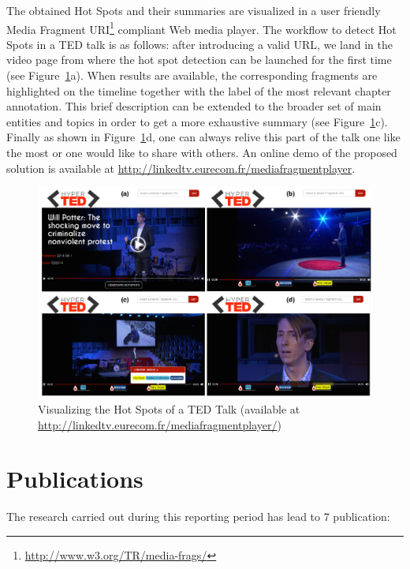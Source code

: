 \documentclass[a4paper,11pt]{report}
\begin{document}
The obtained Hot Spots and their summaries are visualized in a user friendly Media Fragment URI\footnote{\url{http://www.w3.org/TR/media-frags/}} compliant Web media player. The workflow to detect Hot Spots in a TED talk is as follows: after introducing a valid URL, we land in the video page from where the hot spot detection can be launched for the first time (see Figure~\ref{fig:demoScreenShots}a). When results are available, the corresponding fragments are highlighted on the timeline together with the label of the most relevant chapter annotation. This brief description can be extended to the broader set of main entities and topics in order to get a more exhaustive summary (see Figure~\ref{fig:demoScreenShots}c). Finally as shown in Figure~\ref{fig:demoScreenShots}d, one can always relive this part of the talk one like the most or one would like to share with others. An online demo of the proposed solution is available at \url{http://linkedtv.eurecom.fr/mediafragmentplayer}.

\begin{figure}[htbp!]
\centering
\includegraphics[width=1\textwidth]{figure/Ted_U}
\caption{Visualizing the Hot Spots of a TED Talk (available at \url{http://linkedtv.eurecom.fr/mediafragmentplayer/})}
\label{fig:demoScreenShots}
\end{figure}


\chapter{Publications}
\label{sec:publications}
The research carried out during this reporting period has lead to 7 publication:
\end{document}

